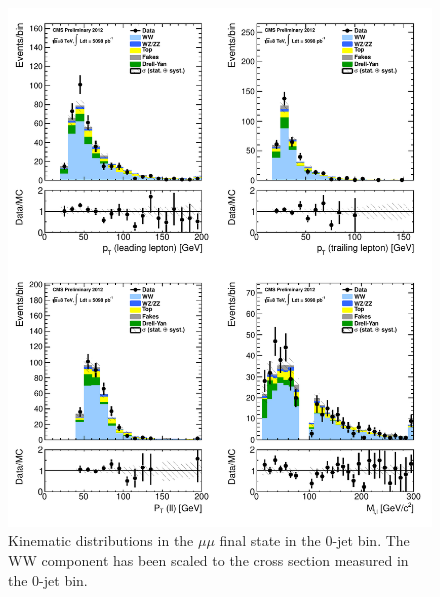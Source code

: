 \begin{figure}[!hbtp]
\centering
\includegraphics[width=1\textwidth]{figures/ww_analysis20_0_ALL_mm_0j.pdf} %
\caption{Kinematic distributions in the $\mu\mu$ final state in the 0-jet bin.
The WW component has been scaled to the cross section measured in the 0-jet bin.}
\label{fig:xs_kinematics_mm_0j}
\end{figure}
